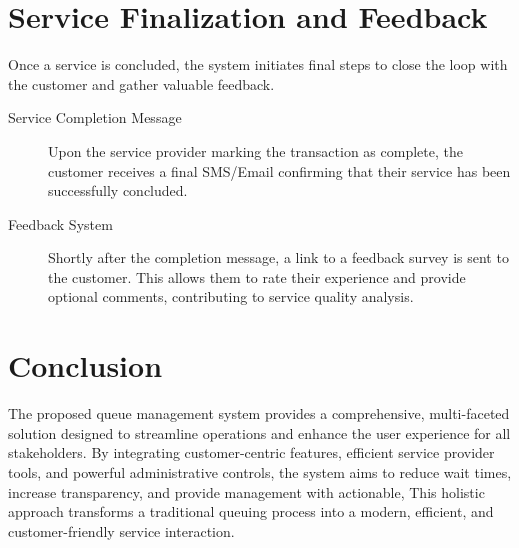 \documentclass{article}
\begin{document}
\section{Service Finalization and Feedback}

Once a service is concluded, the system initiates final steps to close the loop with the customer and gather valuable feedback.

\begin{description}
    \item[Service Completion Message] Upon the service provider marking the transaction as complete, the customer receives a final SMS/Email confirming that their service has been successfully concluded.
    \item[Feedback System] Shortly after the completion message, a link to a feedback survey is sent to the customer. This allows them to rate their experience and provide optional comments, contributing to service quality analysis.
\end{description}

\section{Conclusion}

The proposed queue management system provides a comprehensive, multi-faceted solution designed to streamline operations and enhance the user experience for all stakeholders. By integrating customer-centric features, efficient service provider tools, and powerful administrative controls, the system aims to reduce wait times, increase transparency, and provide management with actionable, This holistic approach transforms a traditional queuing process into a modern, efficient, and customer-friendly service interaction.
\end{document}

